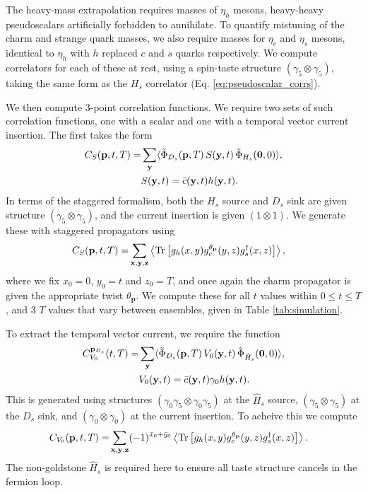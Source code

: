 The heavy-mass extrapolation requires masses of $\eta_h$ mesons, heavy-heavy pseudoscalars artificially forbidden to annihilate. To quantify mistuning of the charm and strange quark masses, we also require masses for $\eta_c$ and $\eta_s$ mesons, identical to $\eta_h$ with $h$ replaced $c$ and $s$ quarks respectively. We compute correlators for each of these at rest, using a spin-taste structure $(\gamma_5\otimes \gamma_5)$, taking the same form as the $H_s$ correlator (Eq. \eqref{eq:pseudoscalar_corrs}).

We then compute 3-point correlation functions. We require two sets of such correlation functions, one with a scalar and one with a temporal vector current insertion. The first takes the form
\begin{align}
  C_S({\textbf{p}},t,T) =& \sum_{{\bf{y}}} \langle \tilde{\Phi}_{D_s}({\bf{p}},T)\, S({\bf{y}},t) \,\tilde{\Phi}_{H_s}({\bf{0}},0) \rangle, \\ &S({\bf{y}},t) = \bar{c}({\bf{y}},t) h({\bf{y}},t). \nonumber
\end{align}
In terms of the staggered formalism, both the $H_s$ source and $D_s$ sink are given structure $(\gamma_5\otimes \gamma_5)$, and the current insertion is given $(1\otimes1)$. We generate these with staggered propagators using
\begin{align}
  C_S({\textbf{p}},t,T) =& \sum_{{\bf{x},\bf{y},\bf{z}}} \left\langle \text{Tr}\left[ g_h(x,y)g^{\theta_{\textbf{p}}}_c(y,z) g^{\dagger}_s(x,z) \right] \right\rangle,
\end{align}
where we fix $x_0 = 0$, $y_0=t$ and $z_0=T$, and once again the charm propagator is given the appropriate twist $\theta_{\textbf{p}}$. We compute these for all $t$ values within $0\leq t\leq T$, and 3 $T$ values that vary between ensembles, given in Table \ref{tab:simulation}.

To extract the temporal vector current, we require the function
\begin{align}
  C^{{\bf{p}}_{D_s}}_{V_0}(t,T) =& \sum_{{\bf{y}}} \langle \tilde{\Phi}_{D_s}({\bf{p}},T)\, V_0({\bf{y}},t) \,\tilde{\Phi}_{\hat{H}_s}({\bf{0}},0) \rangle, \\ &V_0({\bf{y}},t) = \bar{c}({\bf{y}},t) \gamma_0 h({\bf{y}},t). \nonumber
\end{align}
This is generated using structures $(\gamma_0\gamma_5\otimes \gamma_0\gamma_5)$ at the $\hat{H}_s$ source, $(\gamma_5\otimes \gamma_5)$ at the $D_s$ sink, and $(\gamma_0\otimes \gamma_0)$ at the current insertion. To acheive this we compute
\begin{align}
  C_{V_0}({\textbf{p}},t,T) =& \sum_{{\bf{x},\bf{y},\bf{z}}} (-1)^{\bar{x}_0+\bar{y}_0} \left\langle \text{Tr}\left[ g_h(x,y)g^{\theta_{\textbf{p}}}_c(y,z) g^{\dagger}_s(x,z) \right] \right\rangle.
\end{align}
The non-goldstone $\hat{H}_s$ is required here to ensure all taste structure cancels in the fermion loop.

